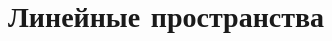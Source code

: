 \documentclass[../main.tex]{subfiles}
\begin{document}
\chapter{Линейные пространства}




\end{document}
